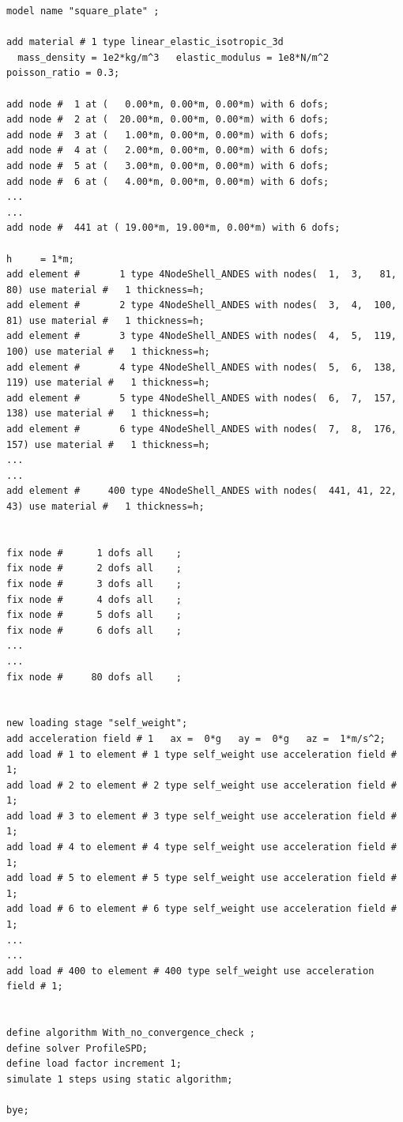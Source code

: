 %
\begin{lstlisting}
model name "square_plate" ;

add material # 1 type linear_elastic_isotropic_3d
  mass_density = 1e2*kg/m^3   elastic_modulus = 1e8*N/m^2   poisson_ratio = 0.3;

add node #  1 at (   0.00*m, 0.00*m, 0.00*m) with 6 dofs;
add node #  2 at (  20.00*m, 0.00*m, 0.00*m) with 6 dofs;
add node #  3 at (   1.00*m, 0.00*m, 0.00*m) with 6 dofs;
add node #  4 at (   2.00*m, 0.00*m, 0.00*m) with 6 dofs;
add node #  5 at (   3.00*m, 0.00*m, 0.00*m) with 6 dofs;
add node #  6 at (   4.00*m, 0.00*m, 0.00*m) with 6 dofs;
...
...
add node #  441 at ( 19.00*m, 19.00*m, 0.00*m) with 6 dofs;

h     = 1*m;       
add element #       1 type 4NodeShell_ANDES with nodes(  1,  3,   81,  80) use material #   1 thickness=h;
add element #       2 type 4NodeShell_ANDES with nodes(  3,  4,  100,  81) use material #   1 thickness=h;
add element #       3 type 4NodeShell_ANDES with nodes(  4,  5,  119, 100) use material #   1 thickness=h;
add element #       4 type 4NodeShell_ANDES with nodes(  5,  6,  138, 119) use material #   1 thickness=h;
add element #       5 type 4NodeShell_ANDES with nodes(  6,  7,  157, 138) use material #   1 thickness=h;
add element #       6 type 4NodeShell_ANDES with nodes(  7,  8,  176, 157) use material #   1 thickness=h;
...
...
add element #     400 type 4NodeShell_ANDES with nodes(  441, 41, 22,  43) use material #   1 thickness=h;


fix node #      1 dofs all    ;
fix node #      2 dofs all    ;
fix node #      3 dofs all    ;
fix node #      4 dofs all    ;
fix node #      5 dofs all    ;
fix node #      6 dofs all    ;
...
...
fix node #     80 dofs all    ;


new loading stage "self_weight";
add acceleration field # 1   ax =  0*g   ay =  0*g   az =  1*m/s^2;
add load # 1 to element # 1 type self_weight use acceleration field # 1;
add load # 2 to element # 2 type self_weight use acceleration field # 1;
add load # 3 to element # 3 type self_weight use acceleration field # 1;
add load # 4 to element # 4 type self_weight use acceleration field # 1;
add load # 5 to element # 5 type self_weight use acceleration field # 1;
add load # 6 to element # 6 type self_weight use acceleration field # 1;
...
...
add load # 400 to element # 400 type self_weight use acceleration field # 1;


define algorithm With_no_convergence_check ;
define solver ProfileSPD;
define load factor increment 1;
simulate 1 steps using static algorithm;

bye;
\end{lstlisting}


